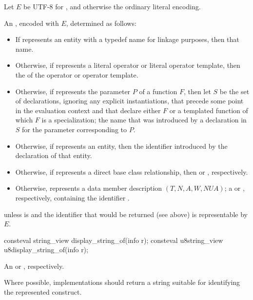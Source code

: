 \begin{itemdescr}
\pnum
Let $E$ be UTF-8 for ,
and otherwise the ordinary literal encoding.

\pnum
\returns
An \ntmbs{}, encoded with $E$,
determined as follows:
\begin{itemize}
\item
  If  represents an entity with a typedef name for linkage purposes,
  then that name.
\item
  Otherwise, if  represents a literal operator or literal operator template,
  then the  of the operator or operator template.
\item
  Otherwise, if  represents the parameter $P$ of a function $F$,
  then let $S$ be the set of declarations,
  ignoring any explicit instantiations,
  that precede some point in the evaluation context
  and that declare either $F$
  or a templated function of which $F$ is a specialization;
  the name that was introduced by a declaration in $S$
  for the parameter corresponding to $P$.
\item
  Otherwise, if  represents an entity,
  then the identifier introduced by the declaration of that entity.
\item
  Otherwise, if  represents a direct base class relationship,
  then  or ,
  respectively.
\item
  Otherwise,  represents a data member description
  $(T, N, A, W, NUA)$;
  a  or , respectively,
  containing the identifier .
\end{itemize}

\pnum
\throws
{} unless
 is 
and the identifier that would be returned (see above)
is representable by $E$.
\end{itemdescr}

%
%
\begin{itemdecl}
consteval string_view display_string_of(info r);
consteval u8string_view u8display_string_of(info r);
\end{itemdecl}

\begin{itemdescr}
\pnum
\returns
An
 or , respectively.

\pnum
\recommended
Where possible,
implementations should return a string
suitable for identifying the represented construct.
\end{itemdescr}

